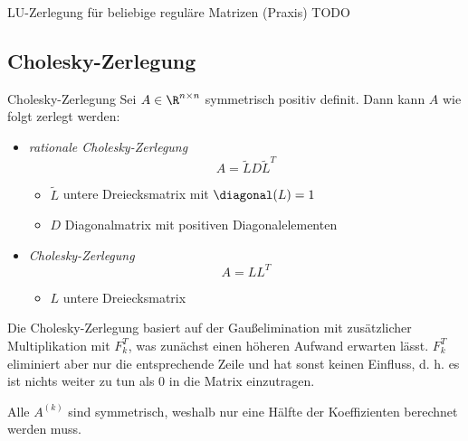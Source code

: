 \begin{code}{LU-Zerlegung für beliebige reguläre Matrizen (Praxis)}
    TODO
\end{code}

\subsection{Cholesky-Zerlegung}

\begin{defi}{Cholesky-Zerlegung}
    Sei $A \in \R^{n \times n}$ symmetrisch positiv definit.
    Dann kann $A$ wie folgt zerlegt werden:
    \begin{itemize}
        \item \emph{rationale Cholesky-Zerlegung}
              \[
                  A = \tilde{L} D \tilde{L}^T
              \]
              \begin{itemize}
                  \item $\tilde{L}$ untere Dreiecksmatrix mit $\diagonal(L) = 1$
                  \item $D$ Diagonalmatrix mit positiven Diagonalelementen
              \end{itemize}
        \item \emph{Cholesky-Zerlegung}
              \[
                  A = LL^T
              \]
              \begin{itemize}
                  \item $L$ untere Dreiecksmatrix
              \end{itemize}
    \end{itemize}

    Die Cholesky-Zerlegung basiert auf der Gaußelimination mit zusätzlicher Multiplikation mit $F_k^T$, was zunächst einen höheren Aufwand erwarten lässt.
    $F_k^T$ eliminiert aber nur die entsprechende Zeile und hat sonst keinen Einfluss, d. h. es ist nichts weiter zu tun als $0$ in die Matrix einzutragen.

    Alle $A^{(k)}$ sind symmetrisch, weshalb nur eine Hälfte der Koeffizienten berechnet werden muss.
\end{defi}

